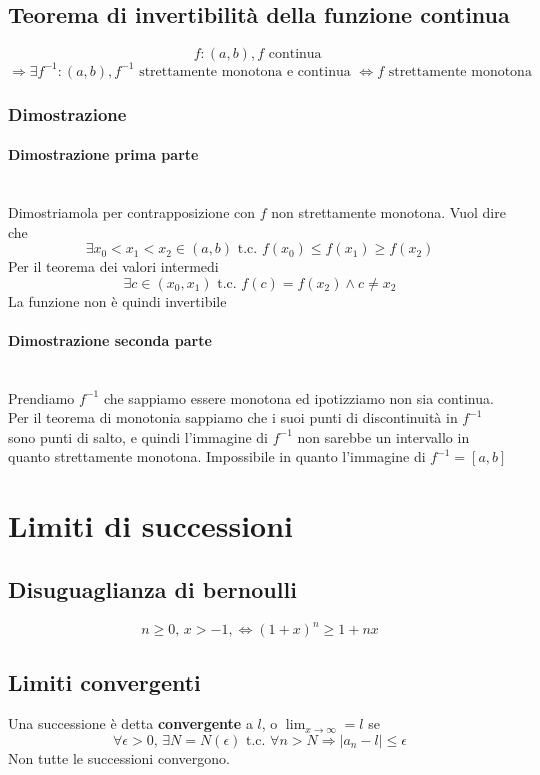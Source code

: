 \documentclass{report}
\newcommand{\subsubsubsection}[1]{\paragraph{#1}\mbox{}\\}
\begin{document}
    \subsection{Teorema di invertibilità della funzione continua}
        $$f: \left(a, b\right), f \textrm{ continua }$$
        $$\Longrightarrow \exists f^{-1}: \left(a, b\right), f^{-1}\textrm{ strettamente monotona e continua } 
            \Longleftrightarrow f \textrm{ strettamente monotona }$$
        \subsubsection{Dimostrazione}
            \subsubsubsection{Dimostrazione prima parte}
                Dimostriamola per contrapposizione con $f$ non strettamente monotona. Vuol dire che
                $$\exists x_0 < x_1 < x_2 \in \left(a, b\right) \textrm{ t.c. } f\left(x_0\right) \leq f\left(x_1\right) \geq f\left(x_2\right)$$
                Per il teorema dei valori intermedi
                $$\exists c \in \left(x_0, x_1\right) \textrm{ t.c. } f\left(c\right) = f\left(x_2\right) \wedge c \neq x_2$$
                La funzione non è quindi invertibile
            \subsubsubsection{Dimostrazione seconda parte}
                Prendiamo $f^{-1}$ che sappiamo essere monotona ed ipotizziamo non sia continua. 
                Per il teorema di monotonia sappiamo che i suoi punti di discontinuità in $f^{-1}$ 
                sono punti di salto, e quindi l'immagine di $f^{-1}$ non sarebbe un intervallo in quanto strettamente monotona.
                Impossibile in quanto l'immagine di $f^{-1} = \left[a, b\right]$
\section{Limiti di successioni}
    \subsection{Disuguaglianza di bernoulli}
        $$n \geq 0,\, x > -1, \Longleftrightarrow \left(1+x\right)^n \geq 1 + nx$$
    \subsection{Limiti convergenti}
        Una successione è detta \textbf{convergente} a $l$, o $\lim_{x \to \infty} = l$ se 
        $$\forall\epsilon > 0,\, \exists N = N\left(\epsilon\right) \textrm{ t.c. } \forall n > N \Longrightarrow
        |a_n - l| \leq \epsilon$$
        Non tutte le successioni convergono.
\end{document}
